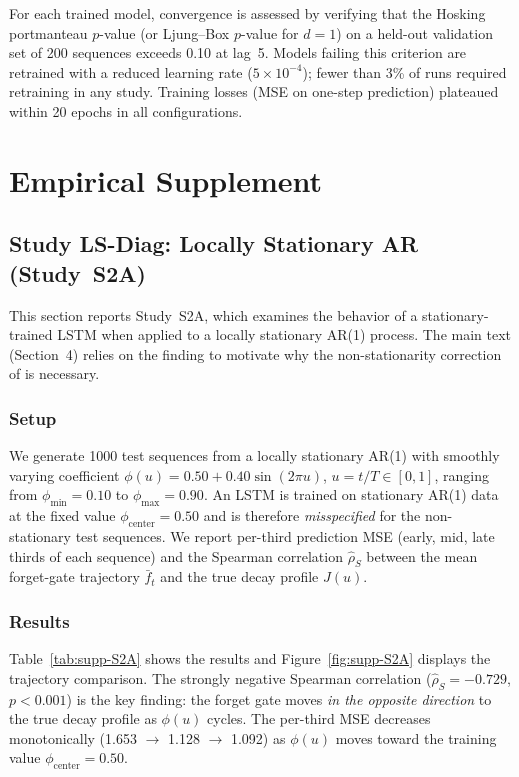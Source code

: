\documentclass[bj,authoryear]{imsart}
\theoremstyle{plain}
\theoremstyle{definition}
\begin{document}
For each trained model, convergence is assessed by verifying that the
Hosking portmanteau $p$-value (or Ljung--Box $p$-value for $d=1$) on a
held-out validation set of 200 sequences exceeds 0.10 at lag~5.
Models failing this criterion are retrained with a reduced learning rate
($5\times10^{-4}$); fewer than 3\% of runs required retraining in any study.
Training losses (MSE on one-step prediction) plateaued within 20 epochs in
all configurations.

\section{Empirical Supplement}
\label{app:supp-empirical}

\subsection{Study LS-Diag: Locally Stationary AR (Study~S2A)}
\label{app:supp-lsdiag}

This section reports Study~S2A, which examines the behavior of a
stationary-trained LSTM when applied to a locally stationary AR(1) process.
The main text (Section~4) relies on the finding to motivate why the
non-stationarity correction of \citet{chang2026jrssb} is necessary.

\subsubsection*{Setup}

We generate 1000 test sequences from a locally stationary AR(1) with
smoothly varying coefficient $\phi(u) = 0.50 + 0.40\sin(2\pi u)$,
$u = t/T \in [0,1]$, ranging from $\phi_{\min} = 0.10$ to $\phi_{\max} = 0.90$.
An LSTM is trained on stationary AR(1) data at the fixed value
$\phi_{\mathrm{center}} = 0.50$ and is therefore \emph{misspecified} for
the non-stationary test sequences.
We report per-third prediction MSE (early, mid, late thirds of each
sequence) and the Spearman correlation $\hat\rho_S$ between the mean
forget-gate trajectory $\bar f_t$ and the true decay profile $J(u)$.

\subsubsection*{Results}

Table~\ref{tab:supp-S2A} shows the results and Figure~\ref{fig:supp-S2A}
displays the trajectory comparison.
The strongly negative Spearman correlation ($\hat\rho_S = -0.729$,
$p < 0.001$) is the key finding: the forget gate moves \emph{in the
opposite direction} to the true decay profile as $\phi(u)$ cycles.
The per-third MSE decreases monotonically (1.653 $\to$ 1.128 $\to$ 1.092)
as $\phi(u)$ moves toward the training value $\phi_{\mathrm{center}} = 0.50$.
\end{document}
